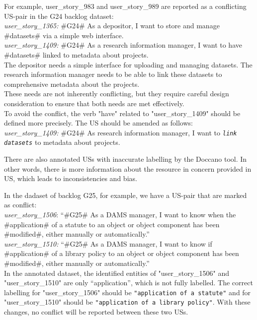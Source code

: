 \begin{example}
	For example, user\_story\_983 and user\_story\_989 are reported as a conflicting US-pair in the G24 backlog dataset:\\
	\textit{user\_story\_1365:} \#G24\# As a depositor, I want to store and manage \#datasets\# via a simple web interface.\\
	\textit{user\_story\_1409:} \#G24\# As a research information manager, I want to have \#datasets\# linked to metadata about projects.\\
	The depositor needs a simple interface for uploading and managing datasets. The research information manager needs to be able to link these datasets to comprehensive metadata about the projects.\\
	These needs are not inherently conflicting, but they require careful design consideration to ensure that both needs are met effectively.\\
	To avoid the conflict, the verb "have" related to "user\_story\_1409" should be defined more precisely. The US should be amended as follows:\\
	\textit{user\_story\_1409:} \#G24\# As research information manager, I want to \textit{\texttt{link} \texttt{datasets}} to metadata about projects.\\
\end{example}

There are also annotated USs with inaccurate labelling by the Doccano tool. In other words, there is more information about the resource in concern provided in US, which leads to inconsistencies and bias.
\begin{example}
	In the dadaset of backlog G25, for example, we have a US-pair that are marked as conflict:\\
	\textit{user\_story\_1506}: \enquote{\#G25\# As a DAMS manager, I want to know when the \#application\# of a statute to an object or object component has been \#modified\#, either manually or automatically.}\\
	\textit{user\_story\_1510:} \enquote{\#G25\# As a DAMS manager, I want to know if \#application\# of a library policy to an object or object component has been \#modified\#, either manually or automatically.}\\
	In the annotated dataset, the identified entities of "user\_story\_1506" and "user\_story\_1510" are only \enquote{application}, which is not fully labelled. The correct labelling for "user\_story\_1506" should be \texttt{"application of a statute"} and for "user\_story\_1510" should be \texttt{"application of a library policy"}. With these changes, no conflict will be reported between these two USs.
\end{example}
